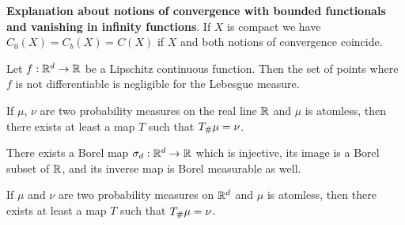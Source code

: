 \textbf{Explanation about notions of convergence with bounded functionals and vanishing in infinity functions}. If $X$ is compact we have $C_0(X)=C_b(X)=C(X)$ if $X$ and both notions of convergence coincide.

\begin{theorem}[Rademacher]
	Let $f:\mathbb{R}^d\rightarrow\mathbb{R}$ be a Lipschitz continuous function. Then the set of points where $f$ is not differentiable is negligible for the Lebesgue measure.
\end{theorem}


\begin{lemma}
If $\mu$, $\nu$ are two probability measures on the real line $\mathbb{R}$ and $\mu$ is atomless, then there exists at least a map $T$ such that ${T}_{\#} \mu=\nu$.
\end{lemma}

\begin{lemma}
There exists a Borel map $\sigma_d: \mathbb{R}^d\rightarrow \mathbb{R}$ which is injective, its image is a Borel subset of $\mathbb{R}$, and its inverse map is Borel measurable as well.
\end{lemma}

\begin{theorem}
If $\mu$ and $\nu$ are two probability measures on $\mathbb{R}^d$ and $\mu$ is atomless, then there exists at least a map $T$ such that ${T}_{\#} \mu=\nu$.
\end{theorem}
